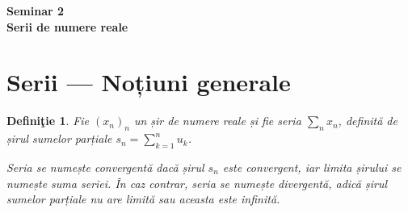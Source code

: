 \documentclass[11pt,a4paper]{article}
\newcommand\ds{\displaystyle}
\theoremstyle{dotless}
\theoremstyle{dotlessdr}
\newtheorem{definition}{Defini\c{t}ie}[section]
\begin{document}
\begin{center}
  {\large\textbf{Seminar 2 \\ Serii de numere reale}}
\end{center}

\vspace{1cm}

\section{Serii --- Noțiuni generale}
\begin{definition}\label{def:serie}
  Fie $(x_n)_n$ un șir de numere reale și fie seria $\sum_n x_n$, definită
  de șirul sumelor parțiale $s_n = \ds\sum_{k=1}^n u_k$.

  Seria se numește \emph{convergentă} dacă șirul $s_n$ este convergent, iar
  limita șirului se numește \emph{suma seriei}. În caz contrar, seria se numește
  \emph{divergentă}, adică șirul sumelor parțiale nu are limită sau aceasta este
  infinită.
\end{definition}
\end{document}
